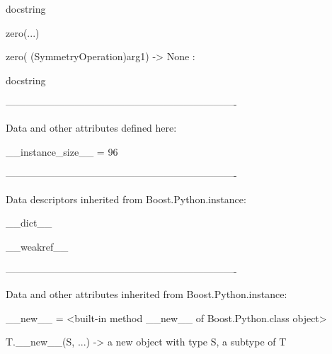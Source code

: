 \documentclass[letterpaper,10pt,english]{sphinxmanual}
\begin{document}
\begin{description}
\begin{description}
\begin{DUlineblock}{0em}
\begin{DUlineblock}{\DUlineblockindent}
\begin{DUlineblock}{\DUlineblockindent}
\item[] docstring
\item[] 
\end{DUlineblock}
\end{DUlineblock}
\item[] zero(...)
\item[]
\begin{DUlineblock}{\DUlineblockindent}
\item[] zero( (SymmetryOperation)arg1) -\textgreater{} None :
\item[]
\begin{DUlineblock}{\DUlineblockindent}
\item[] docstring
\item[] 
\end{DUlineblock}
\end{DUlineblock}
\item[] ----------------------------------------------------------------------
\item[] Data and other attributes defined here:
\item[] 
\item[] \_\_instance\_size\_\_ = 96
\item[] 
\item[] ----------------------------------------------------------------------
\item[] Data descriptors inherited from Boost.Python.instance:
\item[] 
\item[] \_\_dict\_\_
\item[] 
\item[] \_\_weakref\_\_
\item[] 
\item[] ----------------------------------------------------------------------
\item[] Data and other attributes inherited from Boost.Python.instance:
\item[] 
\item[] \_\_new\_\_ = \textless{}built-in method \_\_new\_\_ of Boost.Python.class object\textgreater{}
\item[]
\begin{DUlineblock}{\DUlineblockindent}
\item[] T.\_\_new\_\_(S, ...) -\textgreater{} a new object with type S, a subtype of T
\end{DUlineblock}
\end{DUlineblock}


\end{description}
\end{description}
\end{document}
